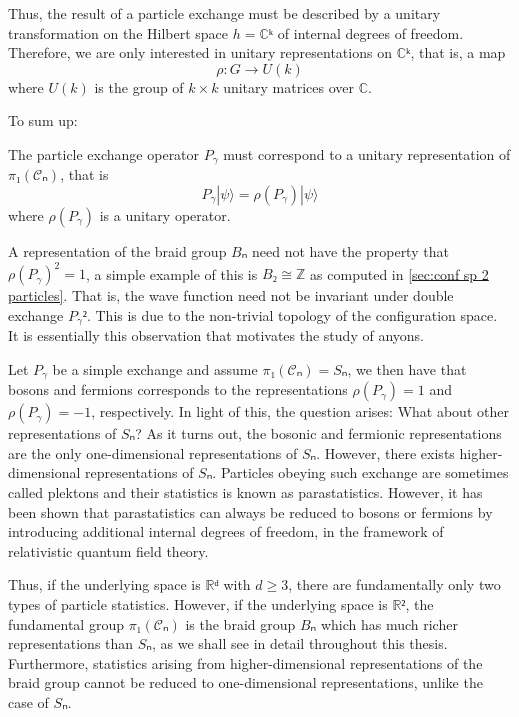 Thus, the result of a particle exchange must be described by a unitary transformation on the Hilbert space $h = ℂᵏ$ of internal degrees of freedom. Therefore, we are only interested in unitary representations on $ℂᵏ$, that is, a map
\begin{equation}
  ρ : G → U(k)
\end{equation}
where $U(k)$ is the group of $k×k$ unitary matrices over $ℂ$.

To sum up:
\begin{lemma}
  The particle exchange operator $P_γ$ must correspond to a unitary representation of $π₁(𝒞ₙ)$, that is
  \begin{equation}
    P_γ |ψ⟩ = ρ(P_γ) |ψ⟩
  \end{equation}
  where $ρ(P_γ)$ is a unitary operator.
\end{lemma}

A representation of the braid group $Bₙ$ need not have the property that $ρ(P_γ)^2 = 1$, a simple example of this is $B₂ ≅ ℤ$ as computed in \cref{sec:conf sp 2 particles}. That is, the wave function need not be invariant under double exchange $P_γ²$. This is due to the non-trivial topology of the configuration space. It is essentially this observation that motivates the study of anyons.

\begin{remark}
  Let $P_γ$ be a simple exchange and assume $π₁(𝒞ₙ) = Sₙ$, we then have that bosons and fermions corresponds to the representations $ρ(P_γ) = 1$ and $ρ(P_γ) = -1$, respectively. In light of this, the question arises: What about other representations of $Sₙ$? As it turns out, the bosonic and fermionic representations are the only one-dimensional representations of $Sₙ$. However, there exists higher-dimensional representations of $Sₙ$. Particles obeying such exchange are sometimes called plektons and their statistics is known as parastatistics. However, it has been shown that parastatistics can always be reduced to bosons or fermions by introducing additional internal degrees of freedom, in the framework of relativistic quantum field theory. \cite{fröhlich,doplicher}
\end{remark}

Thus, if the underlying space is $ℝᵈ$ with $d ≥ 3$, there are fundamentally only two types of particle statistics. However, if the underlying space is $ℝ²$, the fundamental group $π₁(𝒞ₙ)$ is the braid group $Bₙ$ which has much richer representations than $Sₙ$, as we shall see in detail throughout this thesis. Furthermore, statistics arising from higher-dimensional representations of the braid group cannot be reduced to one-dimensional representations, unlike the case of $Sₙ$. \cite{fröhlich}

